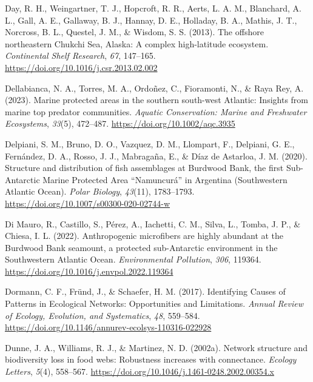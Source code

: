 \documentclass[preprint, 3p,
authoryear]{elsarticle} %
\newlength{\cslhangindent}
\newlength{\cslentryspacingunit} %
\newenvironment{CSLReferences}[2] %
 {%
  \setlength{\parindent}{0pt}
  \ifodd #1
  \let\oldpar\par
  \def\par{\hangindent=\cslhangindent\oldpar}
  \fi
  \setlength{\parskip}{#2\cslentryspacingunit}
 }%
 {}
\begin{document}
\begin{CSLReferences}{1}{0}
\leavevmode{}%
Day, R. H., Weingartner, T. J., Hopcroft, R. R., Aerts, L. A. M.,
Blanchard, A. L., Gall, A. E., Gallaway, B. J., Hannay, D. E., Holladay,
B. A., Mathis, J. T., Norcross, B. L., Questel, J. M., \& Wisdom, S. S.
(2013). The offshore northeastern {Chukchi Sea}, {Alaska}: {A} complex
high-latitude ecosystem. \emph{Continental Shelf Research}, \emph{67},
147--165. \url{https://doi.org/10.1016/j.csr.2013.02.002}

\leavevmode{}%
Dellabianca, N. A., Torres, M. A., Ordoñez, C., Fioramonti, N., \& Raya
Rey, A. (2023). Marine protected areas in the southern south-west
{Atlantic}: {Insights} from marine top predator communities.
\emph{Aquatic Conservation: Marine and Freshwater Ecosystems},
\emph{33}(5), 472--487. \url{https://doi.org/10.1002/aqc.3935}

\leavevmode{}%
Delpiani, S. M., Bruno, D. O., Vazquez, D. M., Llompart, F., Delpiani,
G. E., Fernández, D. A., Rosso, J. J., Mabragaña, E., \& Díaz de
Astarloa, J. M. (2020). Structure and distribution of fish assemblages
at {Burdwood Bank}, the first {Sub-Antarctic Marine Protected Area}
{``{Namuncurá}''} in {Argentina} ({Southwestern Atlantic Ocean}).
\emph{Polar Biology}, \emph{43}(11), 1783--1793.
\url{https://doi.org/10.1007/s00300-020-02744-w}

\leavevmode{}%
Di Mauro, R., Castillo, S., Pérez, A., Iachetti, C. M., Silva, L.,
Tomba, J. P., \& Chiesa, I. L. (2022). Anthropogenic microfibers are
highly abundant at the {Burdwood Bank} seamount, a protected
sub-{Antarctic} environment in the {Southwestern Atlantic Ocean}.
\emph{Environmental Pollution}, \emph{306}, 119364.
\url{https://doi.org/10.1016/j.envpol.2022.119364}

\leavevmode{}%
Dormann, C. F., Fründ, J., \& Schaefer, H. M. (2017). Identifying
{Causes} of {Patterns} in {Ecological Networks}: {Opportunities} and
{Limitations}. \emph{Annual Review of Ecology, Evolution, and
Systematics}, \emph{48}, 559--584.
\url{https://doi.org/10.1146/annurev-ecolsys-110316-022928}

\leavevmode{}%
Dunne, J. A., Williams, R. J., \& Martinez, N. D. (2002a). Network
structure and biodiversity loss in food webs: Robustness increases with
connectance. \emph{Ecology Letters}, \emph{5}(4), 558--567.
\url{https://doi.org/10.1046/j.1461-0248.2002.00354.x}


\end{CSLReferences}
\end{document}
